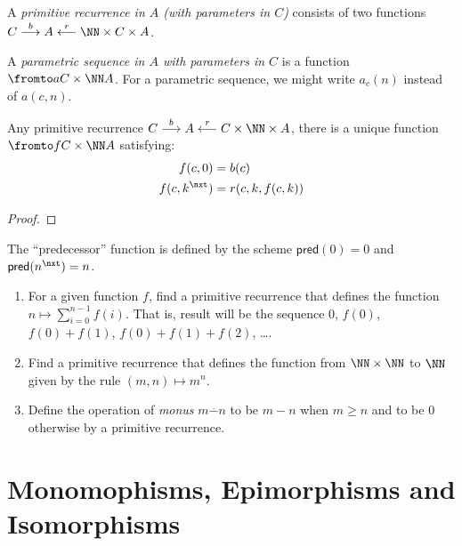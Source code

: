 \begin{defn}
	A \emph{primitive recurrence in $A$ (with parameters in $C$)} consists of two  functions $C\stackrel{b}{\longrightarrow} A\stackrel{r}{\longleftarrow}\NN\times C\times A$.
	
	A \emph{parametric sequence in $A$ with parameters in $C$} is a function
	$\fromto a{C\times \NN}A$. For a parametric sequence, we might write $a_c(n)$
	instead of $a(c,n)$. 
\end{defn}

\begin{lemma}
	Any primitive recurrence $C \stackrel{b}{\longrightarrow} A \stackrel{r}{\longleftarrow} C\times \NN \times A$, there is a unique
	function $\fromto f{C\times \NN}A$ satisfying: 
	\begin{align*}
		f(c,0) &= b(c)\\
		f(c,k^\nxt) &= r(c,k,f(c,k))
	\end{align*}

	\begin{proof}	\end{proof}
\end{lemma}

\newcommand{\pred}{\mathord{\textsf{pred}}}

The ``predecessor'' function is defined by the scheme $\pred(0)=0$ and $\pred(n^\nxt) = n$.

\begin{exercises}
\begin{enumerate}
	\item For a given function $f$, find a primitive recurrence that defines the function $n\mapsto \sum_{i=0}^{n-1}f(i)$. That is, result will be the sequence $0$, $f(0)$, $f(0)+f(1)$, $f(0)+f(1)+f(2)$, \ldots.
	\item Find a primitive recurrence that defines the function from $\NN\times \NN$ to $\NN$ given by the rule $(m,n)\mapsto m^n$.
	\item Define the operation of \emph{monus} $m\stackrel{.}{-} n$ to be $m-n$ when $m \geq n$ and to be $0$ otherwise by  a primitive recurrence.
\end{enumerate}
\end{exercises}

\chapter{Monomophisms, Epimorphisms and Isomorphisms}

